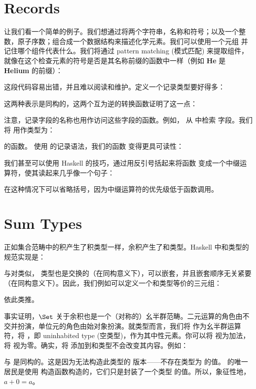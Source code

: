 \section{Records}

让我们看一个简单的例子。我们想通过将两个字符串，名称和符号；以及一个整数，原子序数；组合成一个数据结构来描述化学元素。我们可以使用一个元组  并记住哪个组件代表什么。我们将通过 pattern matching (模式匹配) 来提取组件，就像在这个检查元素的符号是否是其名称前缀的函数中一样（例如 \textbf{He} 是 \textbf{Helium} 的前缀）：

这段代码容易出错，并且难以阅读和维护。定义一个记录类型要好得多：

这两种表示是同构的，这两个互为逆的转换函数证明了这一点：


注意，记录字段的名称也用作访问这些字段的函数。例如， 从  中检索  字段。我们将  用作类型为：

的函数。
使用  的记录语法，我们的函数  变得更具可读性：

我们甚至可以使用 Haskell 的技巧，通过用反引号括起来将函数  变成一个中缀运算符，使其读起来几乎像一个句子：

在这种情况下可以省略括号，因为中缀运算符的优先级低于函数调用。

\section{Sum Types}

正如集合范畴中的积产生了积类型一样，余积产生了和类型。Haskell 中和类型的规范实现是：

与对类似， 类型也是交换的（在同构意义下），可以嵌套，并且嵌套顺序无关紧要（在同构意义下）。因此，我们例如可以定义一个和类型等价的三元组：

依此类推。

事实证明，$\Set$ 关于余积也是一个（对称的）幺半群范畴。二元运算的角色由不交并扮演，单位元的角色由始对象扮演。就类型而言，我们将  作为幺半群运算符，将 ，即 uninhabited type (空类型)，作为其中性元素。你可以将  视为加法，将  视为零。确实，将  添加到和类型不会改变其内容。例如：

与  是同构的。这是因为无法构造此类型的  版本——不存在类型为  的值。 的唯一居民是使用  构造函数构造的，它们只是封装了一个类型  的值。所以，象征性地，$a + 0 = a$。

